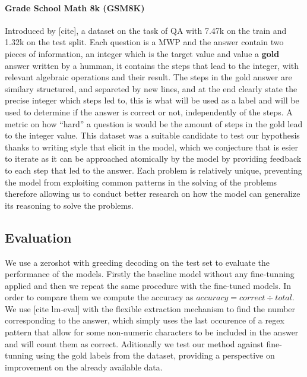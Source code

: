 \documentclass[a4paper,10pt]{article}
\begin{document}
\paragraph{Grade School Math 8k (GSM8K)}
Introduced by [cite], a dataset on the task of QA with 7.47k on the train and 1.32k on the test split. Each question is a MWP and the answer contain two pieces of information, an integer which is the target value and value a \textbf{gold} answer written by a humman, it contains the steps that lead to the integer, with relevant algebraic operations and their result. The steps in the gold answer are similary structured, and separeted by new lines, and at the end clearly state the precise integer which steps led to, this is what will be used as a label and will be used to determine if the answer is correct or not, independently of the steps. A metric on how ``hard'' a question is would be the amount of steps in the gold lead to the integer value. This dataset was a suitable candidate to test our hypothesis thanks to writing style that elicit in the model, which we conjecture that is esier to iterate as it can be approached atomically by the model by providing feedback to each step that led to the answer. Each problem is relatively unique, preventing the model from exploiting common patterns in the solving of the problems therefore allowing us to conduct better research on how the model can generalize its reasoning to solve the problems.


\subsection{Evaluation}
We use a zeroshot with greeding decoding on the test set to evaluate the performance of the models. Firstly the baseline model without any fine-tunning applied and then we repeat the same procedure with the fine-tuned models. In order to compare them we compute the accuracy as  $accuracy = correct \div total$. We use [cite lm-eval] with the flexible extraction mechanism to find the number corresponding to the answer, which simply uses the last occurence of a regex pattern that allow for some non-numeric characters to be included in the answer and will count them as correct. Aditionally we test our method against fine-tunning using the gold labels from the dataset, providing a perspective on improvement on the already available data.
\end{document}
